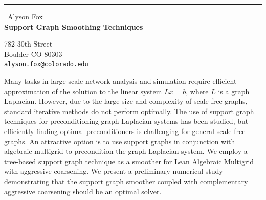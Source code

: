 \documentclass{report}
\begin{document}
\begin{center}
\rule{6in}{1pt} \
{\large Alyson Fox \\
{\bf Support Graph Smoothing Techniques }}

782 30th Street \\ Boulder CO 80303
\\
{\tt alyson.fox@colorado.edu}\end{center}

Many tasks in large-scale network analysis and simulation require
efficient approximation of the solution to the linear system $Lx=b$,
where $L$ is a graph Laplacian. However, due to the large size and
complexity of scale-free graphs, standard iterative methods do not
perform optimally. The use of support graph techniques for
preconditioning graph Laplacian systems has been studied, but efficiently
finding optimal preconditioners is challenging for general scale-free
graphs. An attractive option is to use support graphs in conjunction with
algebraic multigrid to precondition the graph Laplacian system. We employ
a tree-based support graph technique as a smoother for Lean Algebraic
Multigrid with aggressive coarsening. We present a preliminary numerical
study demonstrating that the support graph smoother coupled with
complementary aggressive coarsening should be an optimal solver.
\end{document}
